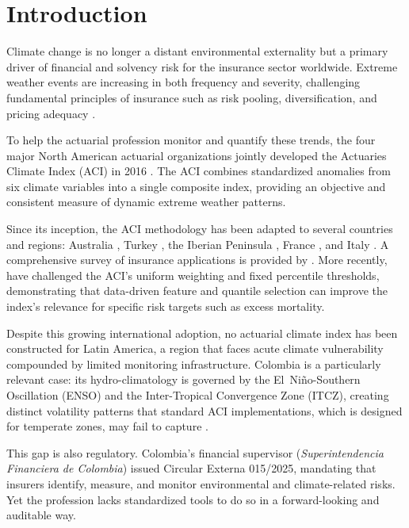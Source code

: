 \documentclass[12pt]{article}
\begin{document}
\tableofcontents
\newpage

\section{Introduction}\label{sec:intro}
 
Climate change is no longer a distant environmental externality but a primary driver of financial and solvency risk for the insurance sector worldwide. Extreme weather events are increasing in both frequency and severity, challenging fundamental principles of insurance such as risk pooling, diversification, and pricing adequacy \citep[see][]{charpentier2008,courbage2022,holzheu2021}.
 
To help the actuarial profession monitor and quantify these trends, the four major North American actuarial organizations jointly developed the Actuaries Climate Index (ACI) in 2016 \citep{aci2016}. The ACI combines standardized anomalies from six climate variables into a single composite index, providing an objective and consistent measure of dynamic extreme weather patterns.
 
Since its inception, the ACI methodology has been adapted to several countries and regions: Australia \citep{aaci2018}, Turkey \citep{nevruz2022}, the Iberian Peninsula \citep{zhou2023iaci}, France \citep{garrido2023faci}, and Italy \citep{rogo2025}. A comprehensive survey of insurance applications is provided by \citet{zhou2024survey}. More recently, \citet{valla2025} have challenged the ACI's uniform weighting and fixed percentile thresholds, demonstrating that data-driven feature and quantile selection can improve the index's relevance for specific risk targets such as excess mortality.
 
Despite this growing international adoption, no actuarial climate index has been constructed for Latin America, a region that faces acute climate vulnerability compounded by limited monitoring infrastructure. Colombia is a particularly relevant case: its hydro-climatology is governed by the El~Ni\~no-Southern Oscillation (ENSO) and the Inter-Tropical Convergence Zone (ITCZ), creating distinct volatility patterns that standard ACI implementations, which is designed for temperate zones, may fail to capture \citep{poveda2011}.
 
This gap is also regulatory. Colombia's financial supervisor (\emph{Superintendencia Financiera de Colombia}) issued Circular Externa 015/2025, mandating that insurers identify, measure, and monitor environmental and climate-related risks. Yet the profession lacks standardized tools to do so in a forward-looking and auditable way.
 
\end{document}
